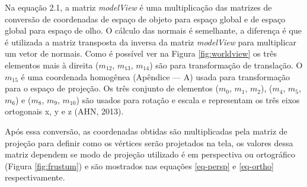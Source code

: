Na equação 2.1, a matriz \textit{modelView} é uma multiplicação das matrizes de conversão de coordenadas de espaço de objeto para espaço global e de espaço global para espaço de olho. O cálculo das normais é semelhante, a diferença é que é utilizada a matriz transposta da inversa da matriz \textit{modelView} para multiplicar um vetor de normais. Como é possível ver na Figura \ref{fig:worldview} os três elementos mais à direita ($ m_{12} $, $ m_{13} $, $ m_{14} $) são para transformação de translação. O $ m_{15} $ é uma coordenada homogênea (Apêndice --- A) usada para transformação para o espaço de projeção. Os três conjunto de elementos ($ m_{0} $, $ m_{1} $, $ m_{2} $), ($ m_{4} $, $ m_{5} $, $ m_{6} $) e ($ m_{8} $, $ m_{9} $, $ m_{10} $) são usados para rotação e escala e representam os três eixos ortogonais x, y e z (AHN, 2013)\nocite{openglOnline}.

Após essa conversão, as coordenadas obtidas são multiplicadas pela matriz de projeção para definir como os vértices serão projetados na tela, os valores dessa matriz dependem se modo de projeção utilizado é em perspectiva ou ortográfico (Figura \ref{fig:frustum}) e são mostrados nas equações \ref{eq-persp} e \ref{eq-ortho} respectivamente. 

